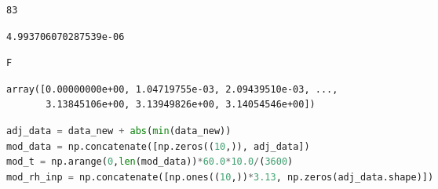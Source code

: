 \begin{spacing}{1} \begin{lstlisting}
83
\end{lstlisting} \end{spacing}

%

\begin{spacing}{1} \begin{lstlisting}
4.993706070287539e-06
\end{lstlisting} \end{spacing}

\begin{spacing}{1} \begin{lstlisting}[language=Python]
F
\end{lstlisting} \end{spacing}

\begin{spacing}{1} \begin{lstlisting}
array([0.00000000e+00, 1.04719755e-03, 2.09439510e-03, ...,
       3.13845106e+00, 3.13949826e+00, 3.14054546e+00])
\end{lstlisting} \end{spacing}

\begin{spacing}{1} \begin{lstlisting}[language=Python]
adj_data = data_new + abs(min(data_new))
mod_data = np.concatenate([np.zeros((10,)), adj_data])
mod_t = np.arange(0,len(mod_data))*60.0*10.0/(3600)
mod_rh_inp = np.concatenate([np.ones((10,))*3.13, np.zeros(adj_data.shape)])
\end{lstlisting} \end{spacing}

